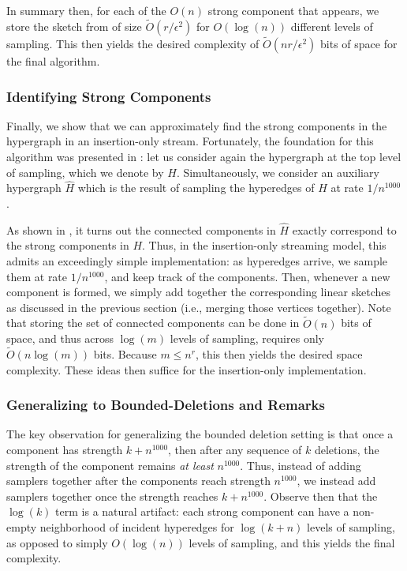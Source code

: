 \documentclass[11pt]{article}
\theoremstyle{definition}
\newcommand{\eps}{\epsilon}
\begin{document}
In summary then, for each of the $O(n)$ strong component that appears, we store the sketch from \cite{KPS24d} of size $\widetilde{O}(r / \eps^2)$ for $O(\log(n))$ different levels of sampling. This then yields the desired complexity of $\widetilde{O}(n r /\eps^2)$ bits of space for the final algorithm. 

\subsubsection{Identifying Strong Components}

Finally, we show that we can approximately find the strong components in the hypergraph in an insertion-only stream. Fortunately, the foundation for this algorithm was presented in \cite{KPS24d}: let us consider again the hypergraph at the top level of sampling, which we denote by $H$. Simultaneously, we consider an auxiliary hypergraph $\hat{H}$ which is the result of sampling the hyperedges of $H$ at rate $1 / n^{1000}$. 

As shown in \cite{KPS24d}, it turns out the connected components in $\hat{H}$ exactly correspond to the strong components in $H$. Thus, in the insertion-only streaming model, this admits an exceedingly simple implementation: as hyperedges arrive,  we sample them at rate $1 / n^{1000}$, and keep track of the components. Then, whenever a new component is formed, we simply add together the corresponding linear sketches as discussed in the previous section (i.e., merging those vertices together). Note that storing the set of connected components can be done in $\widetilde{O}(n)$ bits of space, and thus across $\log(m)$ levels of sampling, requires only $\widetilde{O}(n \log(m))$ bits. Because $m \leq n^r$, this then yields the desired space complexity. These ideas then suffice for the insertion-only implementation.

\subsubsection{Generalizing to Bounded-Deletions and Remarks}

The key observation for generalizing the bounded deletion setting is that once a component has strength $k + n^{1000}$, then after any sequence of $k$ deletions, the strength of the component remains \emph{at least} $n^{1000}$. Thus, instead of adding samplers together after the components reach strength $n^{1000}$, we instead add samplers together once the strength reaches $k + n^{1000}$. Observe then that the $\log(k)$ term is a natural artifact: each strong component can have a non-empty neighborhood of incident hyperedges for $\log(k+n)$ levels of sampling, as opposed to simply $O(\log(n))$ levels of sampling, and this yields the final complexity. 
\end{document}
